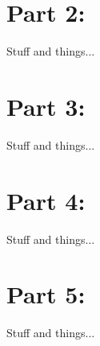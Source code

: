 \documentclass{article}
\begin{document}
\section*{Part 2:}
Stuff and things...

\section*{Part 3:}
Stuff and things...

\section*{Part 4:}
Stuff and things...

\section*{Part 5:}
Stuff and things...
\end{document}

